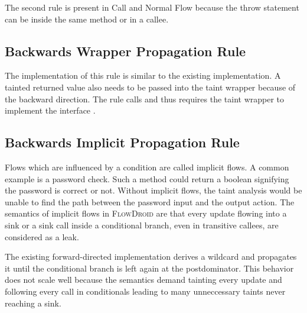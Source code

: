 \documentclass[../draft.tex]{subfiles}
\begin{document}
    The second rule is present in Call and Normal Flow because the throw statement can be inside the same method or in a callee.

    \subsection{Backwards Wrapper Propagation Rule}
    The implementation of this rule is similar to the existing implementation. A tainted returned value also needs to be passed into the taint wrapper because of the backward direction. The rule calls  and thus requires the taint wrapper to implement the  interface .

    \subsection{Backwards Implicit Propagation Rule}
    Flows which are influenced by a condition are called implicit flows. A common example is a password check. Such a method could return a boolean signifying the password is correct or not. Without implicit flows, the taint analysis would be unable to find the path between the password input and the output action. The semantics of implicit flows in \textsc{FlowDroid} are that every update flowing into a sink or a sink call inside a conditional branch, even in transitive callees, are considered as a leak.
    
    The existing forward-directed implementation derives a wildcard and propagates it until the conditional branch is left again at the postdominator. This behavior does not scale well because the semantics demand tainting every update and following every call in conditionals leading to many unneccessary taints never reaching a sink.
    
\end{document}
